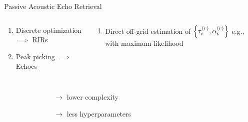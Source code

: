\begin{frame}[t]{\alert{Passive} Acoustic Echo Retrieval \hfill\faBook}
        \vspace{.5em}
        \begin{columns}[T,onlytextwidth] %
            \begin{column}{.48\textwidth}
                \small
                \begin{enumerate}
                    \item Discrete optimization $\implies$ RIRs
                    \item Peak picking $\implies$ Echoes
                \end{enumerate}
            \end{column}
            \begin{column}{.48\textwidth}
                \small
                \begin{enumerate}
                    \item Direct off-grid estimation of $\set{\tauir, \ampir}$
                    e.g., with maximum-likelihood
                \end{enumerate}
            \end{column}%
        \end{columns}

        \vspace{1em}
        \begin{columns}[T,onlytextwidth] %
                \small
                \begin{itemize}
                    \item[\cmark] 
                    \item[\cmark] 
                    \\{\scriptsize~\cite{crocco2016estimation}}
                \end{itemize}
                \small
                \begin{itemize}
                    \item[\cmark] 
                    \begin{itemize}
                        \item[$\to$] lower complexity
                        \item[$\to$] less hyperparameters
                    \end{itemize}
                    \end{itemize}
        \end{columns}


\end{frame}
